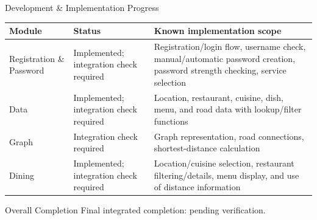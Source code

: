 \documentclass[aspectratio=169,10pt]{beamer}
\begin{document}
\begin{frame}{Development \& Implementation Progress}
\scriptsize
\begin{center}
\renewcommand{\arraystretch}{1.35}
\begin{tabularx}{.96\textwidth}{@{}p{2.5cm}p{2.3cm}X@{}}
\toprule
\textbf{Module} & \textbf{Status} & \textbf{Known implementation scope}\\
\midrule
Registration \& Password & Implemented; integration check required & Registration/login flow, username check, manual/automatic password creation, password strength checking, service selection\\
Data & Implemented; integration check required & Location, restaurant, cuisine, dish, menu, and road data with lookup/filter functions\\
Graph & Integration check required & Graph representation, road connections, shortest-distance calculation\\
Dining & Implemented; integration check required & Location/cuisine selection, restaurant filtering/details, menu display, and use of distance information\\
\bottomrule
\end{tabularx}
\end{center}
\vspace{4mm}
\begin{block}{Overall Completion}
Final integrated completion: pending verification.
\end{block}

\end{frame}
\end{document}
